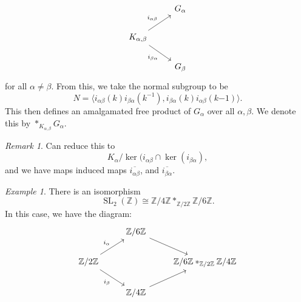 \documentclass[a4paper]{report}
\theoremstyle{definition}
\theoremstyle{remark}
\newtheorem{remark}{Remark}
\theoremstyle{proposition}
\theoremstyle{conjecture}
\theoremstyle{lemma}
\theoremstyle{corollary}
\theoremstyle{exercise}
\newtheorem{example}{Example}
\newcommand{\on}{\operatorname}
\begin{document}
$$\begin{tikzcd}
                                                                 & G_\alpha \\
    {K_{\alpha,\beta}} \arrow[ru, "i_{\alpha\beta}"] \arrow[rd, "i_{\beta\alpha}"'] &          \\
                                                                 & G_\beta 
\end{tikzcd}$$
for all $\alpha \neq \beta$. From this, we take the normal subgroup to be
$$N = \langle i_{\alpha\beta}(k)i_{\beta\alpha}(k^{-1}), i_{\beta\alpha}(k)i_{\alpha\beta}(k{-1})\rangle.$$
This then defines an amalgamated free product of $G_\alpha$ over all
$\alpha,\beta$. We denote this by $\ast_{K_{\alpha,\beta}}G_\alpha.$

\begin{remark}
    Can reduce this to $$K_\alpha /\ker (i_{\alpha\beta}\cap \ker (i_{\beta\alpha}),$$
    and we have maps induced maps $\overline{i_{\alpha\beta}}$, and 
    $\overline{i_{\beta\alpha}}$.
\end{remark}

\begin{example}
    There is an isomorphism
    $$\on{SL}_2(\mathbb{Z}) \cong \mathbb{Z}/4\mathbb{Z} \ast_{\mathbb{Z}/2\mathbb{Z}} \mathbb{Z}/6\mathbb{Z}.$$
    In this case, we have the diagram:
    $$\begin{tikzcd}
                                                                     & \mathbb{Z}/6\mathbb{Z} \arrow[rd] &                                                                             \\
\mathbb{Z}/2\mathbb{Z} \arrow[ru, "i_\alpha"] \arrow[rd, "i_\beta"'] &                                   & \mathbb{Z}/6\mathbb{Z} \ast_{\mathbb{Z}/2\mathbb{Z}} \mathbb{Z}/4\mathbb{Z} \\
                                                                     & \mathbb{Z}/4\mathbb{Z} \arrow[ru] &                                                                            
\end{tikzcd}$$
\end{example}
\end{document}
